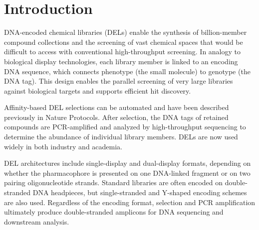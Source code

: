 \section{Introduction}
DNA-encoded chemical libraries (DELs) enable the synthesis of billion-member compound collections and the screening of vast chemical spaces that would be difficult to access with conventional high-throughput screening\cite{brenner_encodedcombinatorialchemistry_1992,franzini_dnaencodedchemicallibraries_2014,favalli_dnaencodedchemicallibraries_2018,neri_dnaencodedchemicallibraries_2018,fitzgerald_dnaencodedchemistrydrug_2021,keller_impactdnaencodedchemical_2022,satz_dnaencodedchemicallibraries_2022,peterson_smallmoleculediscoverydnaencoded_2023,wichert_challengesprospectsdnaencoded_2024}. In analogy to biological display technologies, each library member is linked to an encoding DNA sequence, which connects phenotype (the small molecule) to genotype (the DNA tag). This design enables the parallel screening of very large libraries against biological targets and supports efficient hit discovery\cite{neri_dnaencodedchemicallibraries_2018,huang_strategiesdevelopingdnaencoded_2022}.

Affinity-based DEL selections can be automated and have been described previously in Nature Protocols\cite{decurtins_automatedscreeningsmall_2016}. After selection, the DNA tags of retained compounds are PCR-amplified and analyzed by high-throughput sequencing to determine the abundance of individual library members\cite{decurtins_automatedscreeningsmall_2016,satz_dnaencodedchemicallibraries_2022}. DELs are now used widely in both industry and academia\cite{satz_dnaencodedchemicallibraries_2022,peterson_smallmoleculediscoverydnaencoded_2023,wichert_challengesprospectsdnaencoded_2024,goodnow_dnaencodedchemistryenabling_2017}.

DEL architectures include single-display and dual-display formats, depending on whether the pharmacophore is presented on one DNA-linked fragment or on two pairing oligonucleotide strands\cite{lessing_advancingsmallmoleculedrug_2023}. Standard libraries are often encoded on double-stranded DNA headpieces, but single-stranded and Y-shaped encoding schemes are also used\cite{plais_universalencodingnext_2022}. Regardless of the encoding format, selection and PCR amplification ultimately produce double-stranded amplicons for DNA sequencing and downstream analysis\cite{decurtins_automatedscreeningsmall_2016}.

